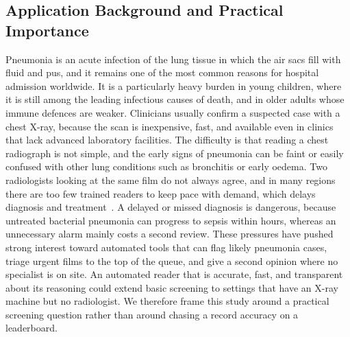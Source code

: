 \documentclass[preprint,12pt]{elsarticle}
\begin{document}
\subsection{Application Background and Practical Importance}
Pneumonia is an acute infection of the lung tissue in which the air sacs fill with fluid and pus, and it remains one of the most common reasons for hospital admission worldwide.
It is a particularly heavy burden in young children, where it is still among the leading infectious causes of death, and in older adults whose immune defences are weaker.
Clinicians usually confirm a suspected case with a chest X-ray, because the scan is inexpensive, fast, and available even in clinics that lack advanced laboratory facilities.
The difficulty is that reading a chest radiograph is not simple, and the early signs of pneumonia can be faint or easily confused with other lung conditions such as bronchitis or early oedema.
Two radiologists looking at the same film do not always agree, and in many regions there are too few trained readers to keep pace with demand, which delays diagnosis and treatment~\cite{kermany2018identifying}.
A delayed or missed diagnosis is dangerous, because untreated bacterial pneumonia can progress to sepsis within hours, whereas an unnecessary alarm mainly costs a second review.
These pressures have pushed strong interest toward automated tools that can flag likely pneumonia cases, triage urgent films to the top of the queue, and give a second opinion where no specialist is on site.
An automated reader that is accurate, fast, and transparent about its reasoning could extend basic screening to settings that have an X-ray machine but no radiologist.
We therefore frame this study around a practical screening question rather than around chasing a record accuracy on a leaderboard.
\end{document}
